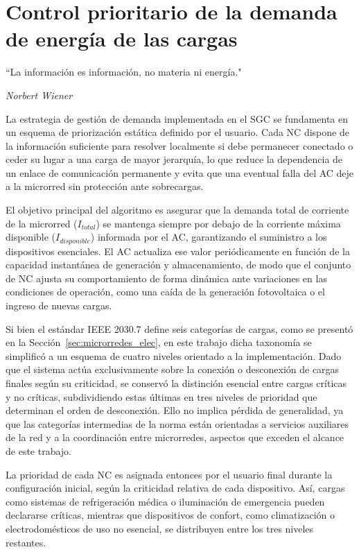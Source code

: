 \cleardoublepage
\chapter{Control prioritario de la demanda de energía de las cargas}
\label{cap:control}
\epigraph{``La información es información, no materia ni energía."}{\textit{Norbert Wiener}}
La estrategia de gestión de demanda implementada en el SGC se fundamenta en un esquema de priorización estática definido por el usuario. Cada NC dispone de la información suficiente para resolver localmente si debe permanecer conectado o ceder su lugar a una carga de mayor jerarquía, lo que reduce la dependencia de un enlace de comunicación permanente y evita que una eventual falla del AC deje a la microrred sin protección ante sobrecargas.

El objetivo principal del algoritmo es asegurar que la demanda total de corriente de la microrred ($I_{total}$) se mantenga siempre por debajo de la corriente máxima disponible ($I_{disponible}$) informada por el AC, garantizando el suministro a los dispositivos esenciales. El AC actualiza ese valor periódicamente en función de la capacidad instantánea de generación y almacenamiento, de modo que el conjunto de NC ajusta su comportamiento de forma dinámica ante variaciones en las condiciones de operación, como una caída de la generación fotovoltaica o el ingreso de nuevas cargas.

Si bien el estándar IEEE 2030.7 define seis categorías de cargas, como se presentó en la Sección~\ref{sec:microrredes_elec}, en este trabajo dicha taxonomía se simplificó a un esquema de cuatro niveles orientado a la implementación. Dado que el sistema actúa exclusivamente sobre la conexión o desconexión de cargas finales según su criticidad, se conservó la distinción esencial entre cargas críticas y no críticas, subdividiendo estas últimas en tres niveles de prioridad que determinan el orden de desconexión. Ello no implica pérdida de generalidad, ya que las categorías intermedias de la norma están orientadas a servicios auxiliares de la red y a la coordinación entre microrredes, aspectos que exceden el alcance de este trabajo.

La prioridad de cada NC es asignada entonces por el usuario final durante la configuración inicial, según la criticidad relativa de cada dispositivo. Así, cargas como sistemas de refrigeración médica o iluminación de emergencia pueden declararse críticas, mientras que dispositivos de confort, como climatización o electrodomésticos de uso no esencial, se distribuyen entre los tres niveles restantes.

